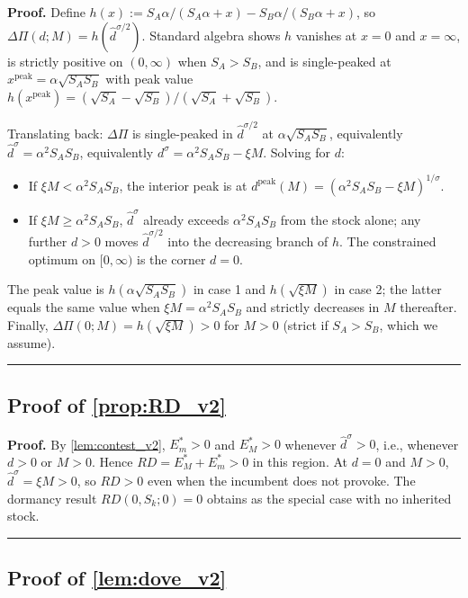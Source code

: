 \documentclass[11pt,twoside]{extarticle}
\newenvironment{proof}[1][Proof]{\noindent \textbf{#1.} }{\ \rule{0.5em}{0.5em}}
\begin{document}
\begin{proof}
Define $h(x) := S_A\alpha / (S_A\alpha + x) - S_B\alpha / (S_B\alpha + x)$,
so $\Delta\Pi(d; M) = h(\hat d^{\sigma/2})$. Standard algebra shows $h$
vanishes at $x = 0$ and $x = \infty$, is strictly positive on $(0, \infty)$
when $S_A > S_B$, and is single-peaked at $x^{\mathrm{peak}} = \alpha\sqrt{S_A S_B}$
with peak value $h(x^{\mathrm{peak}}) = (\sqrt{S_A} - \sqrt{S_B})/(\sqrt{S_A} + \sqrt{S_B})$.

Translating back: $\Delta\Pi$ is single-peaked in $\hat d^{\sigma/2}$ at
$\alpha\sqrt{S_A S_B}$, equivalently $\hat d^\sigma = \alpha^2 S_A S_B$,
equivalently $d^\sigma = \alpha^2 S_A S_B - \xi M$. Solving for $d$:
\begin{itemize}
    \item If $\xi M < \alpha^2 S_A S_B$, the interior peak is at
    $d^{\mathrm{peak}}(M) = (\alpha^2 S_A S_B - \xi M)^{1/\sigma}$.
    \item If $\xi M \ge \alpha^2 S_A S_B$, $\hat d^\sigma$ already exceeds
    $\alpha^2 S_A S_B$ from the stock alone; any further $d > 0$ moves
    $\hat d^{\sigma/2}$ into the decreasing branch of $h$. The constrained
    optimum on $[0, \infty)$ is the corner $d = 0$.
\end{itemize}
The peak value is $h(\alpha\sqrt{S_A S_B})$ in case 1 and $h(\sqrt{\xi M})$
in case 2; the latter equals the same value when $\xi M = \alpha^2 S_A S_B$
and strictly decreases in $M$ thereafter. Finally,
$\Delta\Pi(0; M) = h(\sqrt{\xi M}) > 0$ for $M > 0$ (strict if $S_A > S_B$,
which we assume).
\end{proof}

\subsection*{Proof of \autoref{prop:RD_v2}} \label{app:proof:RD_v2}

\begin{proof}
By \autoref{lem:contest_v2}, $E_m^* > 0$ and $E_M^* > 0$ whenever $\hat d^\sigma > 0$,
i.e., whenever $d > 0$ or $M > 0$. Hence $RD = E_M^* + E_m^* > 0$ in this
region. At $d = 0$ and $M > 0$, $\hat d^\sigma = \xi M > 0$, so $RD > 0$
even when the incumbent does not provoke. The dormancy result
$RD(0, S_k; 0) = 0$ obtains as the special case with no inherited stock.
\end{proof}

\subsection*{Proof of \autoref{lem:dove_v2}} \label{app:proof:dove_v2}
\end{document}
